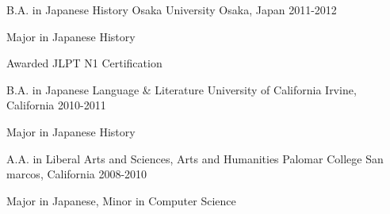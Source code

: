 \begin{cventries}
    \cventry
        {B.A. in Japanese History} %
        {Osaka University} %
        {Osaka, Japan} %
        {2011-2012} %
        {
            \begin{cvitems} %
            \item {Major in Japanese History}
            \item {Awarded JLPT N1 Certification}
            \end{cvitems}
        }

    \cventry
        {B.A. in Japanese Language \& Literature} %
        {University of California} %
        {Irvine, California} %
        {2010-2011} %
        {
            \begin{cvitems} %
            \item {Major in Japanese History}
            \end{cvitems}
        }

    \cventry
        {A.A. in Liberal Arts and Sciences, Arts and Humanities} %
        {Palomar College} %
        {San marcos, California} %
        {2008-2010} %
        {
            \begin{cvitems} %
            \item {Major in Japanese, Minor in Computer Science}
            \end{cvitems}
        }


\end{cventries}
